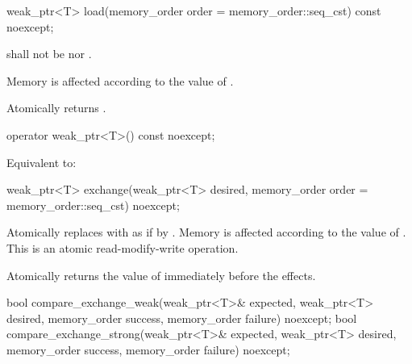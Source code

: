 %
\begin{itemdecl}
weak_ptr<T> load(memory_order order = memory_order::seq_cst) const noexcept;
\end{itemdecl}

\begin{itemdescr}
\pnum
\requires
{} shall not be
 nor .

\pnum
\effects
Memory is affected according to the value of .

\pnum
\returns
Atomically returns .
\end{itemdescr}

%
\begin{itemdecl}
operator weak_ptr<T>() const noexcept;
\end{itemdecl}

\begin{itemdescr}
\pnum
\effects
Equivalent to: 
\end{itemdescr}

%
\begin{itemdecl}
weak_ptr<T> exchange(weak_ptr<T> desired, memory_order order = memory_order::seq_cst) noexcept;
\end{itemdecl}

\begin{itemdescr}
\pnum
\effects
Atomically replaces  with 
as if by .
Memory is affected according to the value of .
This is an atomic read-modify-write operation.

\pnum
\returns
Atomically returns the value of  immediately before the effects.
\end{itemdescr}

%
\begin{itemdecl}
bool compare_exchange_weak(weak_ptr<T>& expected, weak_ptr<T> desired,
                           memory_order success, memory_order failure) noexcept;
bool compare_exchange_strong(weak_ptr<T>& expected, weak_ptr<T> desired,
                             memory_order success, memory_order failure) noexcept;
\end{itemdecl}

